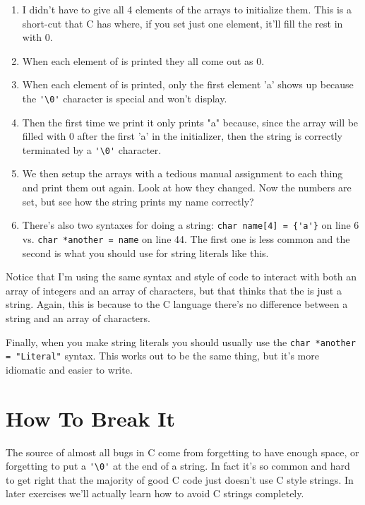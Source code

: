 \begin{enumerate}
\item I didn't have to give all 4 elements of the arrays to initialize them.
    This is a short-cut that C has where, if you set just one element, it'll
    fill the rest in with 0.
\item When each element of  is printed they all come out as
    0.
\item When each element of  is printed, only the first element 'a'
    shows up because the \verb|'\0'| character is special and won't display.
\item Then the first time we print  it only prints "a" because,
    since the array will be filled with 0 after the first 'a' in the 
    initializer, then the string is correctly terminated by a \verb|'\0'|
    character.
\item We then setup the arrays with a tedious manual assignment to each thing
    and print them out again.  Look at how they changed.  Now the numbers
    are set, but see how the  string prints my name correctly?

\item There's also two syntaxes for doing a string:
    \verb|char name[4] = {'a'}| on line 6
    vs. \verb|char *another = name| on line 44.  The first 
    one is less common and the second is what you should use
    for string literals like this.

\end{enumerate}

Notice that I'm using the same syntax and style of code to interact with both
an array of integers and an array of characters, but that 
thinks that the  is just a string.  Again, this is because to the
C language there's no difference between a string and an array of characters.

Finally, when you make string literals you should usually use the
\verb|char *another = "Literal"| syntax.  This works out to be the same thing, 
but it's more idiomatic and easier to write.


\section{How To Break It}

The source of almost all bugs in C come from forgetting to have enough
space, or forgetting to put a \verb|'\0'| at the end of a string.  In
fact it's so common and hard to get right that the majority of good C
code just doesn't use C style strings.  In later exercises we'll actually
learn how to avoid C strings completely.

